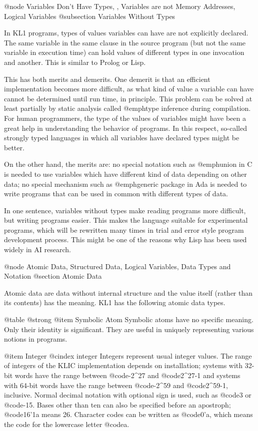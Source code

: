 @node Variables Don't Have Types,  , Variables are not Memory Addresses, Logical Variables
@subsection Variables Without Types

In KL1 programs, types of values variables can have are not explicitly
declared.  The same variable in the same clause in the source program
(but not the same variable in execution time) can hold values of
different types in one invocation and another.  This is similar to
Prolog or Lisp.

This has both merits and demerits.  One demerit is that an efficient
implementation becomes more difficult, as what kind of value a variable
can have cannot be determined until run time, in principle.  This
problem can be solved at least partially by static analysis called
@emph{type inference} during compilation.  For human programmers, the
type of the values of variables might have been a great help in
understanding the behavior of programs.  In this respect, so-called
strongly typed languages in which all variables have declared types
might be better.

On the other hand, the merits are: no special notation such as
@emph{union} in C is needed to use variables which have different kind
of data depending on other data; no special mechanism such as
@emph{generic package} in Ada is needed to write programs that can be
used in common with different types of data.

In one sentence, variables without types make reading programs more
difficult, but writing programs easier.  This makes the language
suitable for experimental programs, which will be rewritten many times
in trial and error style program development process.  This might be one
of the reasons why Lisp has been used widely in AI research.

@node Atomic Data, Structured Data, Logical Variables, Data Types and Notation
@section Atomic Data

Atomic data are data without internal structure and the value itself
(rather than its contents) has the meaning.  KL1 has the following
atomic data types.

@table @strong
@item Symbolic Atom
Symbolic atoms have no specific meaning.  Only their identity is
significant.  They are useful in uniquely representing various notions
in programs.

@item Integer
@cindex integer
Integers represent usual integer values.  The range of integers of the
KLIC implementation depends on installation; systems with 32-bit words
have the range between @code{-2^27} and @code{2^27-1} and systems with
64-bit words have the range between @code{-2^59} and @code{2^59-1},
inclusive.  Normal decimal notation with optional sign is used, such as
@code{3} or @code{-15}.  Bases other than ten can also be specified
before an apostroph; @code{16'1a} means 26.  Character codes can be
written as @code{0'a}, which means the code for the lowercase letter
@code{a}.

